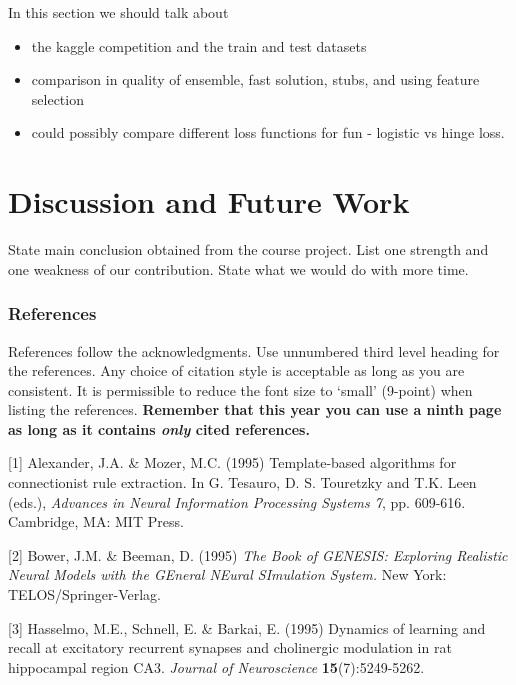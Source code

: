 \documentclass{article} %
\begin{document}
In this section we should talk about

\begin{itemize}
\item the kaggle competition and the train and test datasets
\item comparison in quality of ensemble, fast solution, stubs, and using feature selection
\item could possibly compare different loss functions for fun - logistic vs hinge loss.
\end{itemize}

\section{Discussion and Future Work}

State main conclusion obtained from the course project. List one strength and one weakness of our contribution. State what we would do with more time.

\subsubsection*{References}

References follow the acknowledgments. Use unnumbered third level heading for
the references. Any choice of citation style is acceptable as long as you are
consistent. It is permissible to reduce the font size to `small' (9-point) 
when listing the references. {\bf Remember that this year you can use
a ninth page as long as it contains \emph{only} cited references.}

\small{
[1] Alexander, J.A. \& Mozer, M.C. (1995) Template-based algorithms
for connectionist rule extraction. In G. Tesauro, D. S. Touretzky
and T.K. Leen (eds.), {\it Advances in Neural Information Processing
Systems 7}, pp. 609-616. Cambridge, MA: MIT Press.

[2] Bower, J.M. \& Beeman, D. (1995) {\it The Book of GENESIS: Exploring
Realistic Neural Models with the GEneral NEural SImulation System.}
New York: TELOS/Springer-Verlag.

[3] Hasselmo, M.E., Schnell, E. \& Barkai, E. (1995) Dynamics of learning
and recall at excitatory recurrent synapses and cholinergic modulation
in rat hippocampal region CA3. {\it Journal of Neuroscience}
{\bf 15}(7):5249-5262.
}
\end{document}
